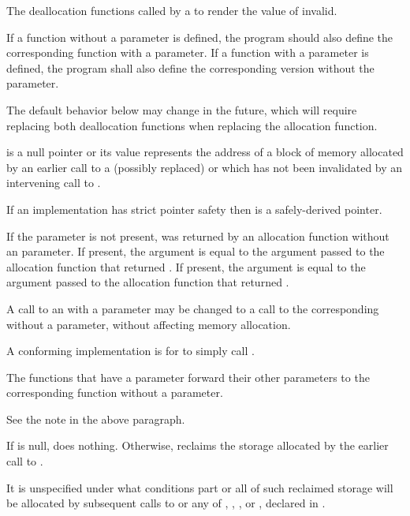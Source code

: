 \begin{itemdescr}
\pnum
\effects
The
deallocation functions
called by a
to render the value of  invalid.

\pnum
\replaceable
{}
If a function without a  parameter is defined,
the program should also define
the corresponding function with a  parameter.
If a function with a  parameter is defined,
the program shall also define
the corresponding version without the  parameter.
\begin{note}
The default behavior below may change in the future, which will require
replacing both deallocation functions when replacing the allocation function.
\end{note}

\pnum
\expects
{} is a null pointer or
its value represents the address of
a block of memory allocated by
an earlier call to a (possibly replaced)
or
which has not been invalidated by an intervening call to
.

\pnum
\expects
If an implementation has strict pointer safety
then  is a safely-derived pointer.

\pnum
\expects
If the  parameter is not present,
 was returned by an allocation function
without an  parameter.
If present, the  argument
is equal to the  argument
passed to the allocation function that returned .
If present, the  argument
is equal to the  argument
passed to the allocation function that returned .

\pnum
\required
A call to an 
with a  parameter
may be changed to
a call to the corresponding 
without a  parameter,
without affecting memory allocation.
\begin{note}
A conforming implementation is for
 to simply call
.
\end{note}

\pnum
{}
The functions that have a  parameter
forward their other parameters
to the corresponding function without a  parameter.
\begin{note}
See the note in the above \replaceable paragraph.
\end{note}

\pnum
{}
If  is null, does nothing. Otherwise, reclaims the
storage allocated by the earlier call to .

\pnum
\remarks
It is unspecified under what conditions part or all of such
%
reclaimed storage will be allocated by subsequent
calls to
or any of
,
,
,
or
,
declared in .
\end{itemdescr}

